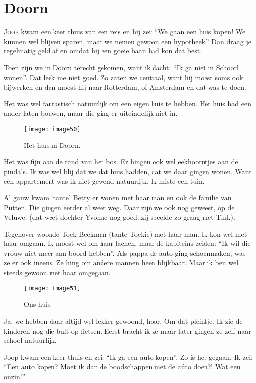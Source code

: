 \chapter*{Doorn}

\lettrine[lines=2, loversize=0.3, lraise=0]{\initfamily J}{oop} kwam een keer thuis van een reis en hij zei: ``We gaan een huis kopen! We kunnen wel blijven sparen, maar we nemen gewoon een hypotheek.'' Dan draag je regelmatig geld af en omdat hij een goeie baan had kon dat best. 

Toen zijn we in Doorn terecht gekomen, want ik dacht: ``Ik ga niet in Schoorl wonen''. Dat leek me niet goed. Zo zaten we centraal, want hij moest soms ook bijwerken en dan moest hij naar Rotterdam, of Amsterdam en dat was te doen.

Het was wel fantastisch natuurlijk om een eigen huis te hebben. Het huis had een ander laten bouwen, maar die ging er uiteindelijk niet in. 

\begin{figure}[h]
    \texttt{[image: image50]}
    \caption{Het huis in Doorn.}
\end{figure}

Het was fijn aan de rand van het bos. Er hingen ook wel eekhoorntjes aan de pinda’s. Ik was wel blij dat we dat huis hadden, dat we daar gingen wonen. Want een appartement was ik niet gewend natuurlijk. Ik miste een tuin.

Al gauw kwam ‘tante’ Betty er wonen met haar man en ook de familie van Putten. Die gingen eerder al weer weg. Daar zijn we ook nog geweest, op de Veluwe. (dat weet dochter Yvonne nog goed..zij speelde zo graag met Tink).

Tegenover woonde Toek Beekman (tante Toekie) met haar man. Ik kon wel met haar omgaan. Ik moest wel om haar lachen, maar de kapiteins zeiden: ``Ik wil die vrouw niet meer aan boord hebben''. Als pappa de auto ging schoonmaken, was ze er ook ineens. Ze hing om andere mannen heen blijkbaar. Maar ik ben wel steeds gewoon met haar omgegaan.

\begin{figure}[h]
    \texttt{[image: image51]}
    \caption{Ons huis.}
\end{figure}

Ja, we hebben daar altijd wel lekker gewoond, hoor. Om dat pleintje. Ik zie de kinderen nog die bult op fietsen. Eerst bracht ik ze maar later gingen ze zelf naar school natuurlijk.

Joop kwam een keer thuis en zei: ``Ik ga een auto kopen''. Zo is het gegaan. Ik zei: ``Een auto kopen? Moet ik dan de boodschappen met de a\'{u}to doen?! Wat een onzin!'' 

